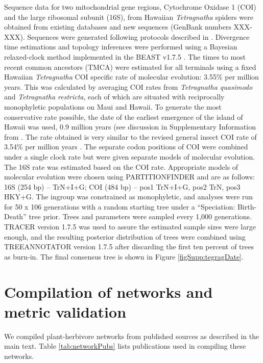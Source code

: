 \documentclass[12pt]{article}
\begin{document}
Sequence data for two mitochondrial gene regions, Cytochrome Oxidase 1
(COI) and the large ribosomal subunit (16S), from Hawaiian {\it Tetragnatha}
spiders were obtained from existing databases and new sequences
(GenBank numbers XXX-XXX).  Sequences were generated following
protocols described in \cite{gillespie2004}. Divergence time
estimations and topology inferences were performed using a Bayesian
relaxed-clock method implemented in the BEAST v1.7.5 \citep{beast}.
The times to most recent common ancestors (TMCA) were estimated for
all terminals using a fixed Hawaiian {\it Tetragnatha} COI specific rate of
molecular evolution: 3.55\% per million years. This was calculated by
averaging COI rates from {\it Tetragnatha quasimodo} and {\it
  Tetragnatha restricta}, each of which are situated with reciprocally
monophyletic populations on Maui and Hawaii. To generate the most
conservative rate possible, the date of the earliest emergence of the
island of Hawaii was used, 0.9 million years (see discussion in
Supplementary Information from \citep{goodman2012}. The rate obtained
is very similar to the revised general insect COI rate of 3.54\% per
million years \citep{papadopoulou2010}.  The separate codon positions
of COI were combined under a single clock rate but were given separate
models of molecular evolution.  The 16S rate was estimated based on
the COI rate.  Appropriate models of molecular evolution were chosen
using PARTITIONFINDER \citep{partitionfinder} and are as follows: 16S
(254 bp) – TrN+I+G; COI (484 bp) – pos1 TrN+I+G, pos2 TrN, pos3 HKY+G.
The ingroup was constrained as monophyletic, and analyses were run for
50 x 106 generations with a random starting tree under a ``Speciation:
Birth-Death'' tree prior.  Trees and parameters were sampled every
1,000 generations.  TRACER version 1.7.5 was used to assure the
estimated sample sizes were large enough, and the resulting posterior
distribution of trees were combined using TREEANNOTATOR version 1.7.5
after discarding the first ten percent of trees as burn-in.  The final
consensus tree is shown in Figure \ref{figSupp:tegragDate}.


\section{Compilation of networks and metric validation}

We compiled plant-herbivore networks from published sources as
described in the main text.  Table \ref{tab:networkPubs} lists
publications used in compiling these networks.
\end{document}
